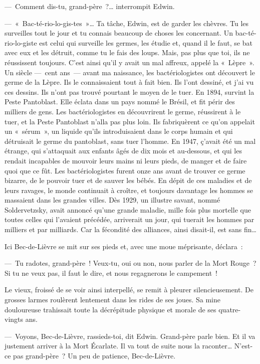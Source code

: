 \documentclass[french,twoside]{book} %
\newcommand\chapterclose{} %
\begin{document}
— Comment dis-tu, grand-père ?… interrompit Edwin.\par
— « Bac-té-rio-lo-gis-tes »… Ta tâche, Edwin, est de garder les chèvres. Tu les surveilles tout le jour et tu connais beaucoup de choses les concernant. Un bac-té-rio-lo-giste est celui qui surveille les germes, les étudie et, quand il le faut, se bat avec eux et les détruit, comme tu le fais des loups. Mais, pas plus que toi, ils ne réussissent toujours. C’est ainsi qu’il y avait un mal affreux, appelé la « Lèpre ». Un siècle — cent ans — avant ma naissance, les bactériologistes ont découvert le germe de la Lèpre. Ils le connaissaient tout à fait bien. Ils l’ont dessiné, et j’ai vu ces dessins. Ils n’ont pas trouvé pourtant le moyen de le tuer. En 1894, survint la Peste Pantoblast. Elle éclata dans un pays nommé le Brésil, et fit périr des milliers de gens. Les bactériologistes en découvrirent le germe, réussirent à le tuer, et la Peste Pantoblast n’alla pas plus loin. Ils fabriquèrent ce qu’on appelait un « sérum », un liquide qu’ils introduisaient dans le corps humain et qui détruisait le germe du pantoblast, sans tuer l’homme. En 1947, ç’avait été un mal étrange, qui s’attaquait aux enfants âgés de dix mois et au-dessous, et qui les rendait incapables de mouvoir leurs mains ni leurs pieds, de manger et de faire quoi que ce fût. Les bactériologistes furent onze ans avant de trouver ce germe bizarre, de le pouvoir tuer et de sauver les bébés. En dépit de ces maladies et de leurs ravages, le monde continuait à croître, et toujours davantage les hommes se massaient dans les grandes villes. Dès 1929, un illustre savant, nommé Soldervetzsky, avait annoncé qu’une grande maladie, mille fois plus mortelle que toutes celles qui l’avaient précédée, arriverait un jour, qui tuerait les hommes par milliers et par milliards. Car la fécondité des alliances, ainsi disait-il, est sans fin…\par
Ici Bec-de-Lièvre se mit sur ses pieds et, avec une moue méprisante, déclara :\par
— Tu radotes, grand-père ! Veux-tu, oui ou non, nous parler de la Mort Rouge ? Si tu ne veux pas, il faut le dire, et nous regagnerons le campement !\par
Le vieux, froissé de se voir ainsi interpellé, se remit à pleurer silencieusement. De grosses larmes roulèrent lentement dans les rides de ses joues. Sa mine douloureuse trahissait toute la décrépitude physique et morale de ses quatre-vingts ans.\par
— Voyons, Bec-de-Lièvre, rassieds-toi, dit Edwin. Grand-père parle bien. Et il va justement arriver à la Mort Écarlate. Il va tout de suite nous la raconter… N’est-ce pas grand-père ? Un peu de patience, Bec-de-Lièvre.\par
\bigbreak
\chapterclose
\end{document}

